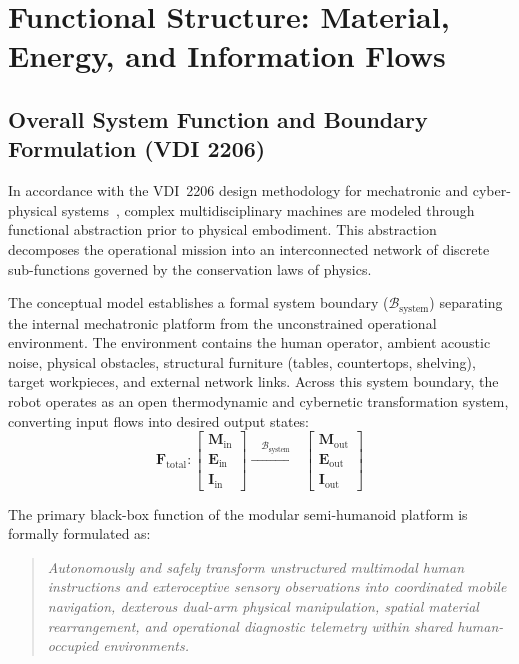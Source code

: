 \section{Functional Structure: Material, Energy, and Information Flows}
\label{sec:functional_structure}

\subsection{Overall System Function and Boundary Formulation (VDI 2206)}
In accordance with the VDI~2206 design methodology for mechatronic and cyber-physical systems~\cite{vdi2206}, complex multidisciplinary machines are modeled through functional abstraction prior to physical embodiment. This abstraction decomposes the operational mission into an interconnected network of discrete sub-functions governed by the conservation laws of physics. 

The conceptual model establishes a formal system boundary ($\mathcal{B}_{\text{system}}$) separating the internal mechatronic platform from the unconstrained operational environment. The environment contains the human operator, ambient acoustic noise, physical obstacles, structural furniture (tables, countertops, shelving), target workpieces, and external network links. Across this system boundary, the robot operates as an open thermodynamic and cybernetic transformation system, converting input flows into desired output states:
\begin{equation}
\mathbf{F}_{\text{total}}: \begin{bmatrix} \mathbf{M}_{\text{in}} \\ \mathbf{E}_{\text{in}} \\ \mathbf{I}_{\text{in}} \end{bmatrix} \xrightarrow{\quad \mathcal{B}_{\text{system}} \quad} \begin{bmatrix} \mathbf{M}_{\text{out}} \\ \mathbf{E}_{\text{out}} \\ \mathbf{I}_{\text{out}} \end{bmatrix}
\end{equation}

The primary black-box function of the modular semi-humanoid platform is formally formulated as:
\begin{quote}
\emph{Autonomously and safely transform unstructured multimodal human instructions and exteroceptive sensory observations into coordinated mobile navigation, dexterous dual-arm physical manipulation, spatial material rearrangement, and operational diagnostic telemetry within shared human-occupied environments.}
\end{quote}

